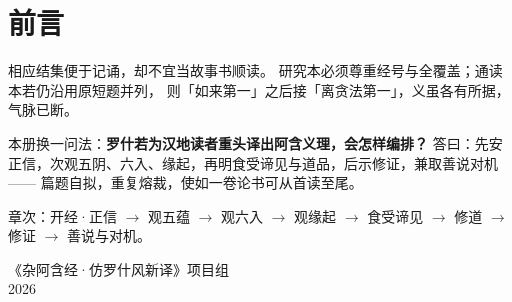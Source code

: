 
\chapter*{前言}

相应结集便于记诵，却不宜当故事书顺读。
研究本必须尊重经号与全覆盖；通读本若仍沿用原短题并列，
则「如来第一」之后接「离贪法第一」，义虽各有所据，气脉已断。

\vspace{0.8em}
\noindent 本册换一问法：\textbf{罗什若为汉地读者重头译出阿含义理，会怎样编排？}
答曰：先安正信，次观五阴、六入、缘起，再明食受谛见与道品，后示修证，兼取善说对机——
篇题自拟，重复熔裁，使如一卷论书可从首读至尾。

\vspace{0.8em}
\noindent 章次：开经·正信 $\rightarrow$ 观五蕴 $\rightarrow$ 观六入 $\rightarrow$ 观缘起 $\rightarrow$
食受谛见 $\rightarrow$ 修道 $\rightarrow$ 修证 $\rightarrow$ 善说与对机。

\vfill
\begin{flushright}
《杂阿含经·仿罗什风新译》项目组\\
2026
\end{flushright}

\clearpage
